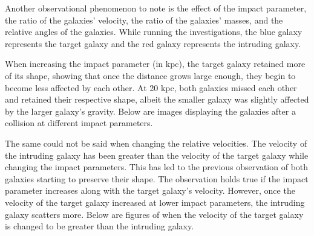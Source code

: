 \documentclass[linenumbers,RNAAS,trackchanges]{aastex631}
\begin{document}
Another observational phenomenon to note is the effect of the impact parameter, the ratio of the galaxies' velocity, the ratio of the galaxies' masses, and the relative angles of the galaxies. While running the investigations, the blue galaxy represents the target galaxy and the red galaxy represents the intruding galaxy.

When increasing the impact parameter (in kpc), the target galaxy retained more of its shape, showing that once the distance grows large enough, they begin to become less affected by each other. At 20 kpc, both galaxies missed each other and retained their respective shape, albeit the smaller galaxy was slightly affected by the larger galaxy's gravity. Below are images displaying the galaxies after a collision at different impact parameters.


The same could not be said when changing the relative velocities. The velocity of the intruding galaxy has been greater than the velocity of the target galaxy while changing the impact parameters. This has led to the previous observation of both galaxies starting to preserve their shape. The observation holds true if the impact parameter increases along with the target galaxy's velocity. However, once the velocity of the target galaxy increased at lower impact parameters, the intruding galaxy scatters more. Below are figures of when the velocity of the target galaxy is changed to be greater than the intruding galaxy.
\end{document}
